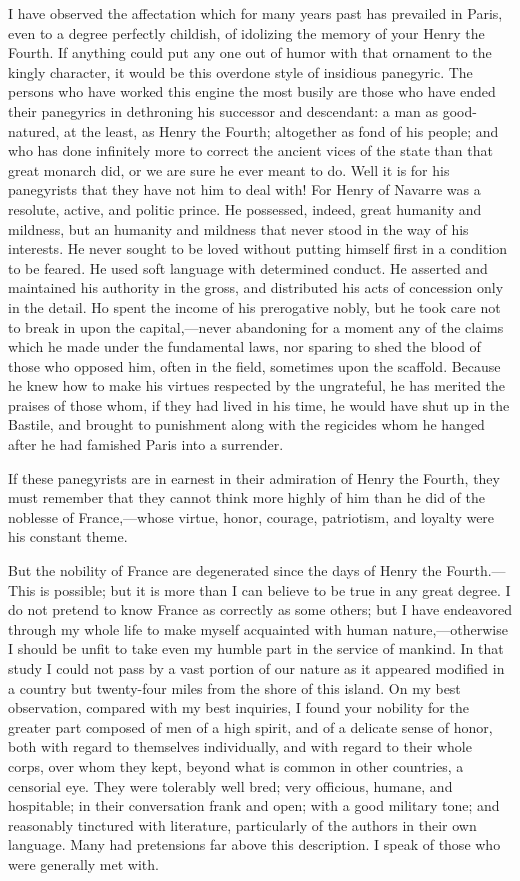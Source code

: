 I have observed the affectation which for many years past has prevailed in Paris, even to a degree perfectly childish, of idolizing the memory of your Henry the Fourth. If anything could put any one out of humor with that ornament to the kingly character, it would be this overdone style of insidious panegyric. The persons who have worked this engine the most busily are those who have ended their panegyrics in dethroning his successor and descendant: a man as good-natured, at the least, as Henry the Fourth; altogether as fond of his people; and who has done infinitely more to correct the ancient vices of the state than that great monarch did, or we are sure he ever meant to do. Well it is for his panegyrists that they have not him to deal with! For Henry of Navarre was a resolute, active, and politic prince. He possessed, indeed, great humanity and mildness, but an humanity and mildness that never stood in the way of his interests. He never sought to be loved without putting himself first in a condition to be feared. He used soft language with determined conduct. He asserted and maintained his authority in the gross, and distributed his acts of concession only in the detail. Ho spent the income of his prerogative nobly, but he took care not to break in upon the capital,—never abandoning for a moment any of the claims which he made under the fundamental laws, nor sparing to shed the blood of those who opposed him, often in the field, sometimes upon the scaffold. Because he knew how to make his virtues respected by the ungrateful, he has merited the praises of those whom, if they had lived in his time, he would have shut up in the Bastile, and brought to punishment along with the regicides whom he hanged after he had famished Paris into a surrender.

If these panegyrists are in earnest in their admiration of Henry the Fourth, they must remember that they cannot think more highly of him than he did of the noblesse of France,—whose virtue, honor, courage, patriotism, and loyalty were his constant theme.

But the nobility of France are degenerated since the days of Henry the Fourth.—This is possible; but it is more than I can believe to be true in any great degree. I do not pretend to know France as correctly as some others; but I have endeavored through my whole life to make myself acquainted with human nature,—otherwise I should be unfit to take even my humble part in the service of mankind. In that study I could not pass by a vast portion of our nature as it appeared modified in a country but twenty-four miles from the shore of this island. On my best observation, compared with my best inquiries, I found your nobility for the greater part composed of men of a high spirit, and of a delicate sense of honor, both with regard to themselves individually, and with regard to their whole corps, over whom they kept, beyond what is common in other countries, a censorial eye. They were tolerably well bred; very officious, humane, and hospitable; in their conversation frank and open; with a good military tone; and reasonably tinctured with literature, particularly of the authors in their own language. Many had pretensions far above this description. I speak of those who were generally met with.

